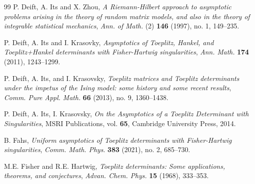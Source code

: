 \documentclass[reqno]{amsart}
\newcommand{\1}{\mathds{1}}
\numberwithin{equation}{section}
\theoremstyle{definition}
\begin{document}
\begin{thebibliography}{99}
 P. Deift, A. Its and X. Zhou, \emph{A Riemann-Hilbert approach to asymptotic problems arising in the theory of random matrix models, and also in the theory of integrable statistical mechanics}, \textit{Ann. of Math.} (2) \textbf{146} (1997), no. 1, 149--235. 


 P. Deift, A. Its and I. Krasovky,
\emph{Asymptotics of Toeplitz, Hankel, and Toeplitz+Hankel determinants with Fisher-Hartwig singularities}, \textit{Ann. Math.} \textbf{174} (2011), 1243--1299.

 P. Deift, A. Its, and I. Krasovsky, \emph{Toeplitz matrices and Toeplitz determinants under the impetus of the Ising model: some history and some recent results}, \textit{Comm. Pure Appl. Math.} \textbf{66} (2013), no. 9, 1360--1438. 

P. Deift, A. Its, I. Krasovsky, \emph{On the Asymptotics of a Toeplitz Determinant with Singularities}, MSRI Publications, vol. \textbf{65}, Cambridge University Press, 2014.





 B. Fahs, \emph{Uniform asymptotics of Toeplitz determinants with Fisher-Hartwig singularities}, \textit{Comm. Math. Phys.} \textbf{383} (2021), no. 2, 685--730.



 M.E. Fisher and R.E. Hartwig, \emph{Toeplitz determinants: Some applications, theorems, and conjectures}, \textit{Advan. Chem. Phys.} \textbf{15} (1968), 333--353.







\end{thebibliography}
\end{document}
